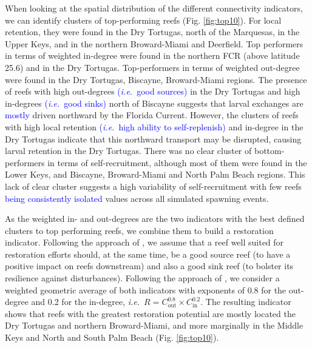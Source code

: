 \documentclass[preprint,12pt,authoryear]{elsarticle}
\newcommand{\modif}[1]{\textcolor{blue}{#1}}
\newcommand{\ie}{{\it i.e.}\ }
\begin{document}
	When looking at the spatial distribution of the different connectivity indicators, we can identify clusters of top-performing reefs (Fig. \ref{fig:top10}). For local retention, they were found in the Dry Tortugas, north of the Marquesas, in the Upper Keys, and in the northern Broward-Miami and Deerfield. Top performers in terms of weighted in-degree were found in the northern FCR (above latitude 25.6) and in the Dry Tortugas. Top-performers in terms of weighted out-degree were found in the Dry Tortugas, Biscayne, Broward-Miami regions. The presence of reefs with high out-degrees \modif{(\ie good sources)} in the Dry Tortugas and high in-degrees \modif{(\ie good sinks)} north of Biscayne suggests that larval exchanges are \modif{mostly} driven northward by the Florida Current. However, the clusters of reefs with high local retention \modif{(\ie high ability to self-replenish)} and in-degree in the Dry Tortugas indicate that this northward transport may be disrupted, causing larval retention in the Dry Tortugas. There was no clear cluster of bottom-performers in terms of self-recruitment, although most of them were found in the Lower Keys, and Biscayne, Broward-Miami and North Palm Beach regions. This lack of clear cluster suggests a high variability of self-recruitment with few reefs \modif{being consistently isolated} values across all simulated spawning events.
	
	As the weighted in- and out-degrees are the two indicators with the best defined clusters to top performing reefs, we combine them to build a restoration indicator. Following the approach of \cite{frys2020fine}, we assume that a reef well suited for restoration efforts should, at the same time, be a good source reef (to have a positive impact on reefs downstream) and also a good sink reef (to bolster its resilience against disturbances). Following the approach of \cite{tnc2024}, we consider a weighted geometric average of both indicators with exponents of 0.8 for the out-degree and 0.2 for the in-degree, \ie $R = C_\text{out}^{0.8} \times C_\text{in}^{0.2}$. The resulting indicator shows that reefs with the greatest restoration potential are mostly located the Dry Tortugas and northern Broward-Miami, and more marginally in the Middle Keys and North and South Palm Beach (Fig. \ref{fig:top10}).
	
\end{document}
